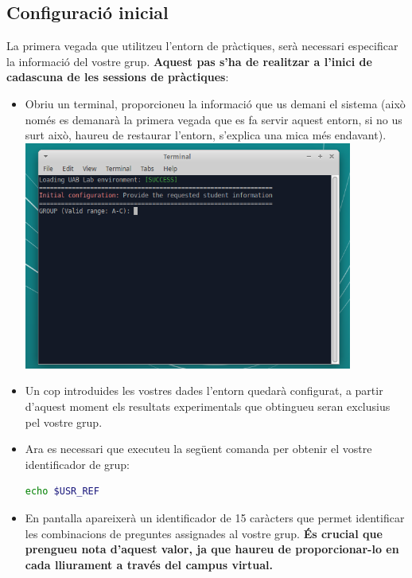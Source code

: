 \documentclass[12pt,a4paper]{article}
\begin{document}
\subsection{Configuració inicial}
La primera vegada que utilitzeu l'entorn de pràctiques, serà necessari especificar la informació del vostre grup. \textbf{Aquest pas s'ha de realitzar a l'inici de cadascuna de les sessions de pràctiques}:
\begin{itemize}
 \item Obriu un terminal, proporcioneu la informació que us demani el sistema (això només es demanarà la primera vegada que es fa servir aquest entorn, si no us surt això, haureu de restaurar l'entorn, s'explica una mica més endavant).
     \newline \includegraphics[width=0.85\textwidth]{ubuntu5}
 \item Un cop introduides les vostres dades l'entorn quedarà configurat, a partir d'aquest moment els resultats experimentals que obtingueu seran exclusius pel vostre grup.
 \item Ara es necessari que executeu la següent comanda per obtenir el vostre identificador de grup:
 \begin{lstlisting}[language=bash,basicstyle=\footnotesize]
   echo $USR_REF
\end{lstlisting}
 \item En pantalla apareixerà un identificador de 15 caràcters que permet identificar les combinacions de preguntes assignades al vostre grup. \textbf{És crucial que prengueu nota d'aquest valor, ja que haureu de proporcionar-lo en cada lliurament a través del campus virtual.}


\end{itemize}
\end{document}
